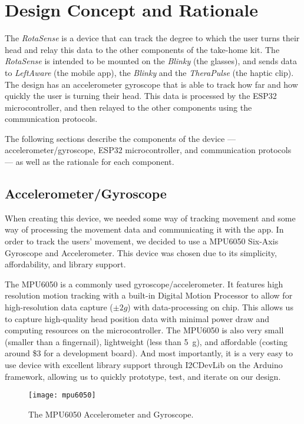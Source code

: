 \chapter{Design Concept and Rationale}
\label{chap:design}

The \textit{RotaSense} is a device that can track the degree to which the user
turns their head and relay this data to the other components of the take-home
kit. The \textit{RotaSense} is intended to be mounted on the \textit{Blinky} (the
glasses), and sends data to \textit{LeftAware} (the mobile app), the
\textit{Blinky} and the \textit{TheraPulse} (the haptic clip). The design has
an accelerometer gyroscope that is able to track how far and how quickly the
user is turning their head. This data is processed by the ESP32
microcontroller, and then relayed to the other components using
the communication protocols. 

The following sections describe the components of the
device --- accelerometer/gyroscope, ESP32 microcontroller, and communication
protocols --- as well as the rationale for each component.

\section{Accelerometer/Gyroscope}\label{sec:mpu6050}

When creating this device, we needed some way of tracking movement and some way
of processing the movement data and communicating it with the app. In order to
track the users’ movement, we decided to use a MPU6050 Six-Axis Gyroscope and
Accelerometer. This device was chosen due to its simplicity, affordability, and
library support.

The MPU6050 is a commonly used gyroscope/accelerometer. It features high
resolution motion tracking with a built-in Digital Motion Processor to allow for
high-resolution data capture ($\pm 2g$) with data-processing on chip. This
allows us to capture high-quality head position data with minimal power draw and
computing resources on the microcontroller. The MPU6050 is also very small
(smaller than a fingernail), lightweight (less than \qty{5}{\g}), and affordable
(costing around \$3 for a development board). And most importantly, it is a very
easy to use device with excellent library support through I2CDevLib on the
Arduino framework, allowing us to quickly prototype, test, and iterate on our
design.

\begin{figure}[h]
  \centering
  \texttt{[image: mpu6050]}
  \caption{The MPU6050 Accelerometer and Gyroscope.}
\end{figure}

